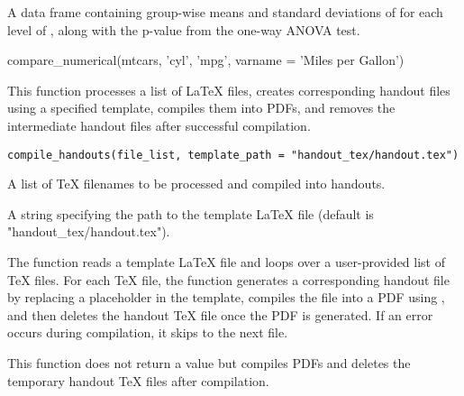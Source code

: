 \documentclass[a4paper]{book}
\begin{document}
%
\begin{Value}
A data frame containing group-wise means and standard deviations of  for each level of , along with the p-value from the one-way ANOVA test.
\end{Value}
%
\begin{Examples}
\begin{ExampleCode}
compare_numerical(mtcars, 'cyl', 'mpg', varname = 'Miles per Gallon')

\end{ExampleCode}
\end{Examples}
%
\begin{Description}
This function processes a list of LaTeX files, creates corresponding handout files using a specified template, compiles them into PDFs, and removes the intermediate handout files after successful compilation.
\end{Description}
%
\begin{Usage}
\begin{verbatim}
compile_handouts(file_list, template_path = "handout_tex/handout.tex")
\end{verbatim}
\end{Usage}
%
\begin{Arguments}
\begin{ldescription}
\item[\code{file\_list}] A list of TeX filenames to be processed and compiled into handouts.

\item[\code{template\_path}] A string specifying the path to the template LaTeX file (default is "handout\_tex/handout.tex").
\end{ldescription}
\end{Arguments}
%
\begin{Details}
The function reads a template LaTeX file and loops over a user-provided list of TeX files. For each TeX file, the function generates a corresponding handout file by replacing a placeholder in the template, compiles the file into a PDF using , and then deletes the handout TeX file once the PDF is generated. If an error occurs during compilation, it skips to the next file.
\end{Details}
%
\begin{Value}
This function does not return a value but compiles PDFs and deletes the temporary handout TeX files after compilation.
\end{Value}
\end{document}

